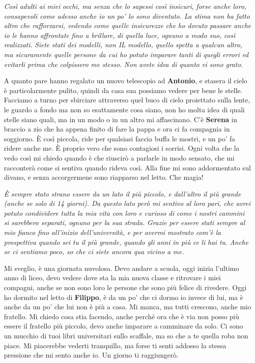 \textit{Così adulti ai miei occhi, ma senza che lo sapessi così insicuri, forse anche loro, consapevoli come adesso anche io un po' lo sono diventato. La stima non ha fatto altro che rafforzarsi, vedendo come quelle insicurezze che ho dovuto passare anche io le hanno affrontate fino a brillare, di quella luce, ognuno a modo suo, così realizzati. Siete stati dei modelli, non IL modello, quello spetta a qualcun altro, ma sicuramente quelle persone da cui ho potuto imparare tanti di quegli errori ed evitarli prima che colpissero me stesso. Non avete idea di quanto vi sono grato.}
\vspace{5mm}

A quanto pare hanno regalato un nuovo telescopio ad \textbf{Antonio}, e stasera il cielo è particolarmente pulito, quindi da casa sua possiamo vedere per bene le stelle. Facciamo a turno per sbirciare attraverso quel buco di cielo proiettato sulla lente, le guardo a fondo ma non so esattamente cosa siano, non ho molta idea di quali stelle siano quali, ma in un modo o in un altro mi affascinano. C'è \textbf{Serena} in braccio a zio che ha appena finito di fare la pappa e ora ci fa compagnia in soggiorno. È così piccola, ride per qualsiasi faccia buffa le mostri, e un po' fa ridere anche me. È proprio vero che sono contagiosi i sorrisi. Ogni volta che la vedo così mi chiedo quando è che riuscirò a parlarle in modo sensato, che mi racconterà come si sentiva quando rideva così. Alla fine mi sono addormentato sul divano, e senza accorgermene sono riapparso nel letto. Che magia!
\vspace{5mm}

\textit{È sempre stato strano essere da un lato il più piccolo, e dall'altro il più grande (anche se solo di 14 giorni). Da questo lato però mi sentivo al loro pari, che avrei potuto condividere tutta la mia vita con loro e curioso di come i nostri cammini si sarebbero separati, ognuno per la sua strada. Grazie per essere stati sempre al mio fianco fino all'inizio dell'università, e per avermi mostrato com'è la prospettiva quando sei tu il più grande, quando gli anni in più ce li hai tu. Anche se ci sentiamo poco, so che ci siete ancora qua vicino a me.}

\separatore

Mi sveglio, è una giornata nuvolosa. Devo andare a scuola, oggi inizia l'ultimo anno di liceo, devo vedere dove sta la mia nuova classe e ritrovare i miei compagni, anche se non sono loro le persone che sono più felice di rivedere. Oggi ho dormito nel letto di \textbf{Filippo}, è da un po' che ci dormo io invece di lui, ma è anche da un po' che lui non è più a casa. Mi manca, ma tutti crescono, anche mio fratello. Mi chiedo cosa stia facendo, anche perché ora che è via non posso più essere il fratello più piccolo, devo anche imparare a camminare da solo. Ci sono un mucchio di tuoi libri universitari sullo scaffale, ma so che a te quella roba non piace. Mi piacerebbe vederti tranquillo, ma forse ti senti addosso la stessa pressione che mi sento anche io. Un giorno ti raggiungerò.
\vspace{5mm}

